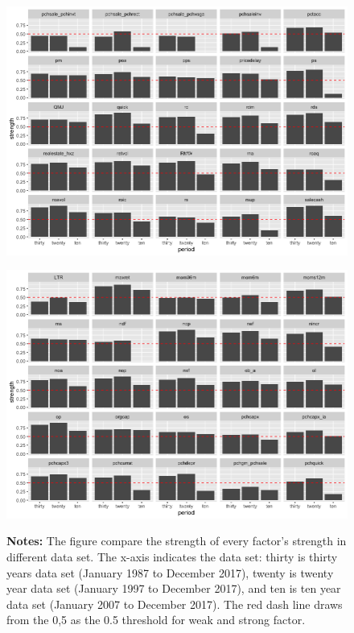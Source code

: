 \begin{landscape}
	\begin{figure}[ht]
		\includegraphics[scale = 0.75]{strength_comparison_V}
		\centering
	\end{figure}
\end{landscape}

\begin{landscape}
	\begin{figure}[ht]
		\includegraphics[scale = 0.75]{strength_comparison_IV}
		\centering
		\begin{minipage}{\textwidth}
			{\footnotesize {\bf Notes:} The figure compare the strength of every factor's strength in different data set. The x-axis indicates the data set: thirty is thirty years data set (January 1987 to December 2017), twenty is twenty year data set (January 1997 to December 2017), and ten is ten year data set (January 2007 to December 2017). The red dash line draws from the 0,5 as the 0.5 threshold for weak and strong factor.}
		\end{minipage}
	\end{figure}
\end{landscape}

